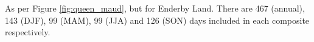 \label{fig:enderby}
As per Figure \ref{fig:queen_maud}, but for Enderby Land. There are 467 (annual), 143 (DJF), 99 (MAM), 99 (JJA) and 126 (SON) days included in each composite respectively.